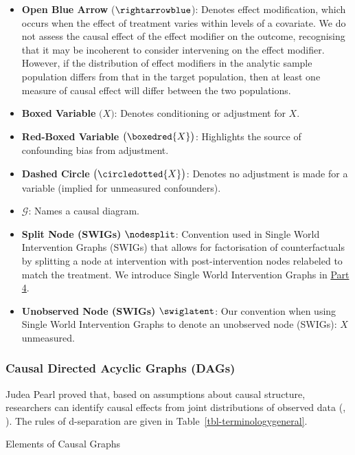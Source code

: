 \documentclass[
  single column]{article}
\begin{document}
\begin{itemize}
\item
  \textbf{Open Blue Arrow} (\(\rightarrowblue\)): Denotes effect
  modification, which occurs when the effect of treatment varies within
  levels of a covariate. We do not assess the causal effect of the
  effect modifier on the outcome, recognising that it may be incoherent
  to consider intervening on the effect modifier. However, if the
  distribution of effect modifiers in the analytic sample population
  differs from that in the target population, then at least one measure
  of causal effect will differ between the two populations.
\item
  \textbf{Boxed Variable} \(\big(\boxed{X}\big)\): Denotes conditioning
  or adjustment for \(X\).
\item
  \textbf{Red-Boxed Variable} \(\big(\boxedred{X}\big)\): Highlights the
  source of confounding bias from adjustment.
\item
  \textbf{Dashed Circle} \(\big(\circledotted{X}\big)\): Denotes no
  adjustment is made for a variable (implied for unmeasured
  confounders).
\item
  \textbf{\(\mathcal{G}\)}: Names a causal diagram.
\item
  \textbf{Split Node (SWIGs)} \(\nodesplit\): Convention used in Single
  World Intervention Graphs (SWIGs) that allows for factorisation of
  counterfactuals by splitting a node at intervention with
  post-intervention nodes relabeled to match the treatment. We introduce
  Single World Intervention Graphs in \hyperref[id-sec-4]{Part 4}.
\item
  \textbf{Unobserved Node (SWIGs)} \(\swiglatent\): Our convention when
  using Single World Intervention Graphs to denote an unobserved node
  (SWIGs): \(X\) unmeasured.
\end{itemize}

\subsubsection{Causal Directed Acyclic Graphs
(DAGs)}\label{causal-directed-acyclic-graphs-dags}

Judea Pearl proved that, based on assumptions about causal structure,
researchers can identify causal effects from joint distributions of
observed data (,
). The rules of d-separation are given in
Table~\ref{tbl-terminologygeneral}.

\begin{table}

\caption{\label{tbl-terminologygeneral}Elements of Causal Graphs}

\centering{

\terminologydirectedgraph

}

\end{table}%
\end{document}
